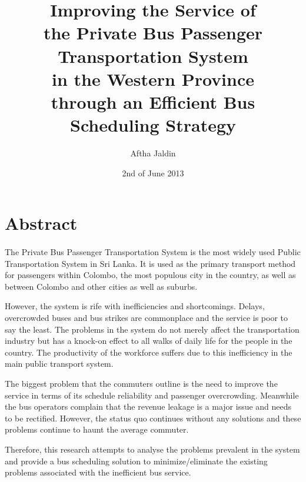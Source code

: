 \documentclass[12pt, oneside]{report}
\title{
Improving the Service of
\\ the Private Bus Passenger Transportation System
\\ in the Western Province
\\ through an Efficient Bus Scheduling Strategy
}
\author{Aftha Jaldin}
\date{2nd of June 2013}
\begin{document}
\maketitle

\tableofcontents
\newpage
{}

\listoffigures
\newpage

\listoftables
\newpage

\section*{Abstract}

\paragraph{ } The Private Bus Passenger Transportation System is the most widely used Public Transportation System in Sri Lanka. It is used as the primary transport method for passengers within Colombo, the most populous city in the country, as well as between Colombo and other cities as well as suburbs.

However, the system is rife with inefficiencies and shortcomings. Delays, overcrowded buses and bus strikes are commonplace and the service is poor to say the least. The problems in the system do not merely affect the transportation industry but has a knock-on effect to all walks of daily life for the people in the country. The productivity of the workforce suffers due to this inefficiency in the main public transport system.

The biggest problem that the commuters outline is the need to improve the service in terms of its schedule reliability and passenger overcrowding. Meanwhile the bus operators complain that the revenue leakage is a major issue and needs to be rectified. However, the status quo continues without any solutions and these problems continue to haunt the average commuter.

Therefore, this research attempts to analyse the problems prevalent in the system and provide a bus scheduling solution to minimize/eliminate the existing problems associated with the inefficient bus service.

\newpage
\end{document}
